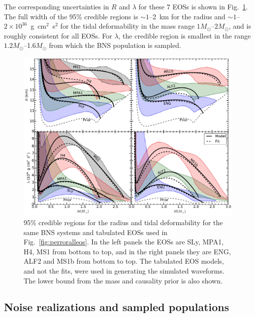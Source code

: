 \documentclass[twocolumn,prd,amssymb,aps,nofootinbib,showpacs,epsf]{revtex4}
\begin{document}
The corresponding uncertainties in $R$ and $\lambda$ for these 7 EOSs is shown in Fig.~\ref{fig:structurealleos}. The full width of the 95\% credible regions is $\sim 1$--2~km for the radius and $\sim 1$--$2\times 10^{36}$~g~cm$^2$~s$^2$ for the tidal deformability in the mass range $1M_\odot$--$2M_\odot$, and is roughly consistent for all EOSs. For $\lambda$, the credible region is smallest in the range $1.2M_\odot$--1.6$M_\odot$ from which the BNS population is sampled.

\begin{figure}[!htb]
\begin{center}
\includegraphics[width=6.4in]{constraintsalleos.pdf}
\caption{95\% credible regions for the radius and tidal deformability for the same BNS systems and tabulated EOSs used in Fig.~\ref{fig:perroralleos}. In the left panels the EOSs are SLy, MPA1, H4, MS1 from bottom to top, and in the right panels they are ENG, ALF2 and MS1b from bottom to top. The tabulated EOS models, and not the fits, were used in generating the simulated waveforms. The lower bound from the mass and causality prior is also shown.}
\label{fig:structurealleos}
\end{center}
\end{figure}

\subsection{Noise realizations and sampled populations}
\end{document}
